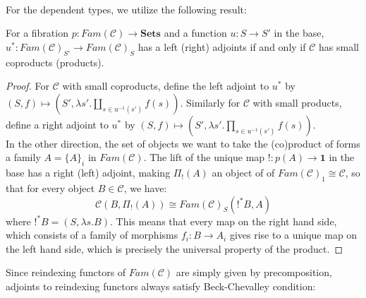 \\
For the dependent types, we utilize the following result:
\begin{thm}\label{adjointproducts}
For a fibration $p : Fam(\mathcal{C}) \to \mathbf{Sets}$ and a function $u : S \to S'$ in the base, $u^* : Fam(\mathcal{C})_{S'} \to Fam(\mathcal{C})_S$ has a left (right) adjoints if and only if $\mathcal{C}$ has small coproducts (products).
  \begin{proof}
    For $\mathcal{C}$ with small coproducts, define the left adjoint to $u^*$ by $(S, f) \mapsto (S', \lambda s'.\coprod_{s \in u^{-1}(s')}f(s))$. Similarly for $\mathcal{C}$ with small products, define a right adjoint to $u^*$ by $(S, f) \mapsto (S', \lambda s'.\prod_{s \in u^{-1}(s')}f(s))$.\\
    In the other direction, the set of objects we want to take the (co)product of forms a family $A = \{A\}_i$ in $Fam(\mathcal{C})$. The lift of the unique map $! : p(A) \to \mathbf{1}$ in the base has a right (left) adjoint, making $\Pi_!(A)$ an object of of $Fam(\mathcal{C})_1 \cong \mathcal{C}$, so that for every object $B \in \mathcal{C}$, we have:
    \[
      \mathcal{C}(B, \Pi_!(A)) \cong Fam({\mathcal{C}})_S(!^*B, A)
    \]
    where $!^*B = (S, \lambda s. B)$. This means that every map on the right hand side, which consists of a family of morphisms $f_i : B \to A_i$ gives rise to a unique map on the left hand side, which is precisely the universal property of the product.
  \end{proof}
\end{thm}
Since reindexing functors of $Fam(\mathcal{C})$ are simply given by precomposition, adjoints to reindexing functors always satisfy Beck-Chevalley condition:
